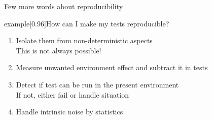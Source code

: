 \begin{frame}{Few more words about reproducibility}
    \vspace{-5mm}
    \begin{varblock}{example}[0.96\textwidth]{How can I make my tests reproducible?}
        \begin{enumerate}
            \item Isolate them from non-deterministic aspects \\
            \then This is not always possible!
            \item Measure unwanted environment effect and subtract it in tests
            \item Detect if test can be run in the present environment\\
            \then If not, either fail or handle situation
            \item \alert{Handle intrinsic noise by statistics}\\
        \end{enumerate}
    \end{varblock}
\end{frame}
